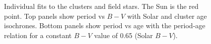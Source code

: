 \documentclass[11pt,preprint]{aastex}
\begin{document}
\begin{figure}[ht]
\begin{center}
    \end{center}
    \caption{ Individual fits to the clusters and field stars. The Sun is the red point. Top panels show period vs $B-V$ with Solar and cluster age isochrones. Bottom panels show period vs age with the period-age relation for a constant $B-V$ value of 0.65 (Solar $B-V$).
\label{fig:subfigures2}}
\end{figure}
\end{document}
